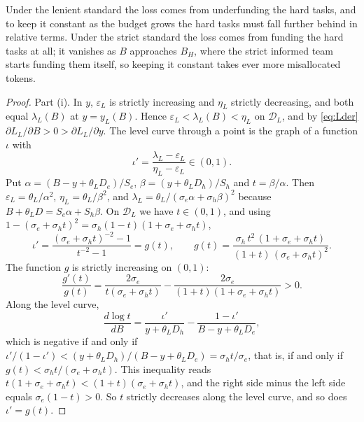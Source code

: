 \documentclass[11pt]{article}
\theoremstyle{definition}
\begin{document}
Under the lenient standard the loss comes from underfunding the hard tasks, and to keep it constant as the budget grows the hard tasks must fall further behind in relative terms. Under the strict standard the loss comes from funding the hard tasks at all; it vanishes as $B$ approaches $B_H$, where the strict informed team starts funding them itself, so keeping it constant takes ever more misallocated tokens.

\begin{proof}
Part (i). In $y$, $\varepsilon_L$ is strictly increasing and $\eta_L$ strictly decreasing, and both equal $\lambda_L(B)$ at $y=y_L(B)$. Hence $\varepsilon_L<\lambda_L(B)<\eta_L$ on $\mathcal D_L$, and by \eqref{eq:Lder} $\partial L_L/\partial B>0>\partial L_L/\partial y$. The level curve through a point is the graph of a function $\iota$ with
\[
\iota'=\frac{\lambda_L-\varepsilon_L}{\eta_L-\varepsilon_L}\in(0,1).
\]
Put $\alpha=(B-y+\theta_LD_e)/S_e$, $\beta=(y+\theta_LD_h)/S_h$ and $t=\beta/\alpha$. Then $\varepsilon_L=\theta_L/\alpha^2$, $\eta_L=\theta_L/\beta^2$, and $\lambda_L=\theta_L/(\sigma_e\alpha+\sigma_h\beta)^2$ because $B+\theta_LD=S_e\alpha+S_h\beta$. On $\mathcal D_L$ we have $t\in(0,1)$, and using $1-(\sigma_e+\sigma_ht)^2=\sigma_h(1-t)(1+\sigma_e+\sigma_ht)$,
\[
\iota'=\frac{(\sigma_e+\sigma_ht)^{-2}-1}{t^{-2}-1}=g(t),\qquad g(t)=\frac{\sigma_h\,t^2\,(1+\sigma_e+\sigma_ht)}{(1+t)\,(\sigma_e+\sigma_ht)^2}.
\]
The function $g$ is strictly increasing on $(0,1)$:
\[
\frac{g'(t)}{g(t)}=\frac{2\sigma_e}{t(\sigma_e+\sigma_ht)}-\frac{2\sigma_e}{(1+t)(1+\sigma_e+\sigma_ht)}>0 .
\]
Along the level curve,
\[
\frac{d\log t}{dB}=\frac{\iota'}{y+\theta_LD_h}-\frac{1-\iota'}{B-y+\theta_LD_e},
\]
which is negative if and only if $\iota'/(1-\iota')<(y+\theta_LD_h)/(B-y+\theta_LD_e)=\sigma_ht/\sigma_e$, that is, if and only if $g(t)<\sigma_ht/(\sigma_e+\sigma_ht)$. This inequality reads $t(1+\sigma_e+\sigma_ht)<(1+t)(\sigma_e+\sigma_ht)$, and the right side minus the left side equals $\sigma_e(1-t)>0$. So $t$ strictly decreases along the level curve, and so does $\iota'=g(t)$.


\end{proof}
\end{document}
